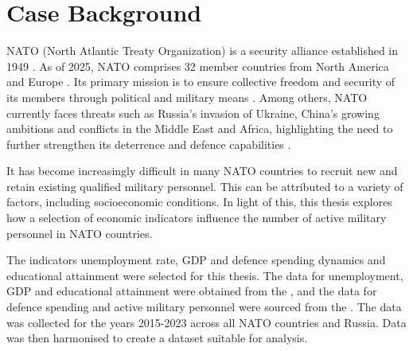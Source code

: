 \chapter{Case Background}

NATO (North Atlantic Treaty Organization) is a security
alliance established in 1949 \parencite{us_mission_to_nato_about_nodate}. As of 2025, NATO
comprises 32 member countries from North America and Europe \parencite{nato_what_nodate}.
Its primary mission is to ensure collective freedom and security of its members through 
political and military means \parencite{us_mission_to_nato_about_nodate}. Among others, NATO currently faces 
threats such as  Russia's invasion of Ukraine, China's growing ambitions and conflicts 
in the Middle East and Africa, highlighting the need to further strengthen its deterrence 
and defence capabilities \parencite{nato_nato_2022}.

It has become increasingly difficult in many NATO countries to recruit new 
and retain existing qualified military personnel. This can be attributed to 
a variety of factors, including socioeconomic conditions. \parencite{nato_research_and_technology_organization_recruiting_2007}
In light of this, this thesis explores how a selection of economic indicators 
influence the number of active military personnel in NATO countries.

The indicators unemployment rate, GDP and defence spending dynamics and educational 
attainment were selected for this thesis. The data for unemployment, GDP and educational 
attainment were obtained from the \textcite{noauthor_world_bank_nodate}, and the data for defence spending 
and active military personnel were sourced from the \textcite{noauthor_military_balance_nodate}. The data 
was collected for the years 2015-2023 across all NATO countries and Russia. 
Data was then harmonised to create a dataset suitable for analysis.
